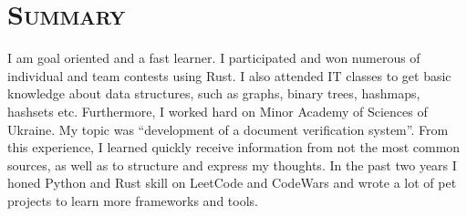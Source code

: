 \vspace*{-3em}
\section{\textsc{Summary}}

I am goal oriented and a fast learner.
I participated and won numerous of individual and team contests using Rust.
I also attended IT classes to get basic knowledge about data structures, such as graphs, binary trees, hashmaps, hashsets etc. 
Furthermore, I worked hard on Minor Academy of Sciences of Ukraine. 
My topic was “development of a document verification system”. 
From this experience, I learned quickly receive information from not the most common sources, as well as to structure and express my thoughts. 
In the past two years I honed Python and Rust skill on LeetCode and CodeWars and wrote a lot of pet projects to learn more frameworks and tools.
